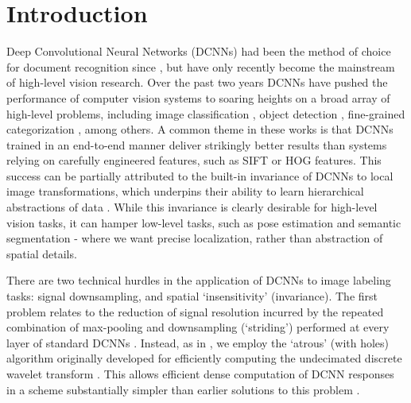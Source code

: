 \section{Introduction}
\label{sec:intro}
Deep Convolutional Neural Networks (DCNNs) had been the method of choice for document recognition since  \citet{LeCun1998}, but 
have only recently become the mainstream of high-level vision research.
Over the past two years  DCNNs have pushed the performance of computer vision systems to soaring heights on a broad array of high-level problems, including image classification \citep{KrizhevskyNIPS2013, sermanet2013overfeat, simonyan2014very, szegedy2014going, papandreou2014untangling}, object detection \citep{girshick2014rcnn}, fine-grained categorization \citep{zhang2014part}, among others.
A common theme in these works is that DCNNs trained in an end-to-end manner  deliver  strikingly better results than systems relying on carefully engineered features, such as SIFT or HOG features.
This success can be partially attributed to the built-in  invariance of DCNNs to local image transformations, which underpins their ability to learn hierarchical abstractions of data \citep{zeiler2014visualizing}. While this invariance is clearly desirable for high-level vision tasks, it can hamper low-level tasks, such as pose estimation \citep{chen2014articulated, tompson2014joint} and semantic segmentation - where we want precise localization, rather than abstraction of spatial details.  %




There are two technical hurdles in the application of DCNNs to image labeling
tasks: signal downsampling, and spatial `insensitivity' (invariance).  The
first problem relates to the reduction of signal resolution incurred by the
repeated combination of max-pooling and downsampling (`striding') performed at
every layer of standard DCNNs \citep{KrizhevskyNIPS2013,
  simonyan2014very, szegedy2014going}. Instead, as in
\citet{papandreou2014untangling}, we employ the `atrous'
(with holes) algorithm originally developed for efficiently computing the
undecimated discrete wavelet transform \cite{Mall99}. This allows
efficient dense computation of DCNN responses in a scheme
substantially simpler than earlier solutions to this problem
\cite{GCMG+13, sermanet2013overfeat}.


